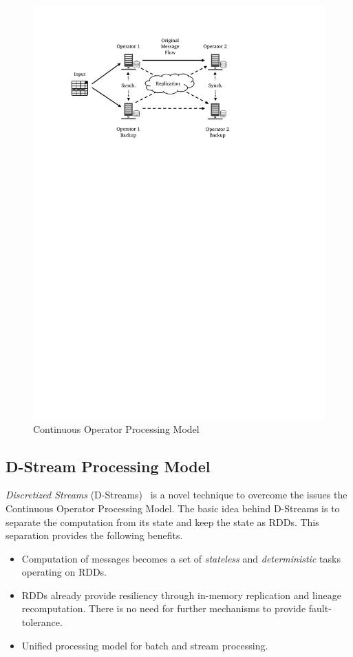 \begin{figure}[ht]
    \centering
    \includegraphics[clip,trim=2.5cm 20cm 6.7cm 2.2cm]{cont-op.pdf}
    \caption{Continuous Operator Processing Model}
    \label{fig:sp:cont-op}
\end{figure}

\subsection{D-Stream Processing Model}
\label{sp:dstream-model}

\emph{Discretized Streams} (D-Streams)~\cite{Zaharia:2013} is a novel technique to overcome the issues the Continuous Operator Processing Model. The basic idea behind D-Streams is to separate the computation from its state and keep the state as RDDs. This separation provides the following benefits.
\begin{itemize}
    \item Computation of messages becomes a set of \emph{stateless} and \emph{deterministic} tasks operating on RDDs.
    \item RDDs already provide resiliency through in-memory replication and lineage recomputation. There is no need for further mechanisms to provide fault-tolerance.
    \item Unified processing model for batch and stream processing.
\end{itemize}

